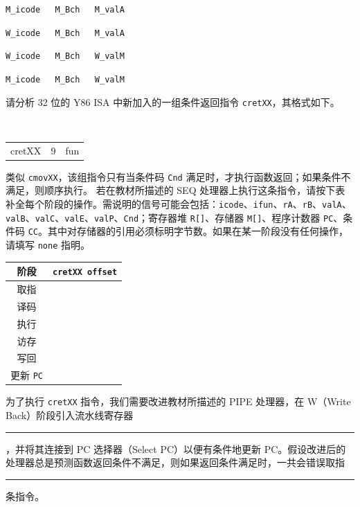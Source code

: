 \begin{problems}
        \begin{choices}
            \item \verb|M_icode   M_Bch   M_valA|
            \item \verb|W_icode   M_Bch   M_valA|
            \item \verb|W_icode   M_Bch   W_valM|
            \item \verb|M_icode   M_Bch   W_valM|
        \end{choices}
         请分析 32 位的 Y86 ISA 中新加入的一组条件返回指令 \verb|cretXX|，其格式如下。
        \begin{table}[H]
            \tt
            \centering
            \begin{tabular}{c|c|c|}
                \cline{2-3}
                cretXX & 9 & fun \\ \cline{2-3} 
            \end{tabular}
        \end{table}
        类似 \verb|cmovXX|，该组指令只有当条件码 \verb|Cnd| 满足时，才执行函数返回；如果条件不满足，则顺序执行。
        \qn 若在教材所描述的 SEQ 处理器上执行这条指令，请按下表补全每个阶段的操作。需说明的信号可能会包括：\verb|icode|、\verb|ifun|、\verb|rA|、\verb|rB|、\verb|valA|、\verb|valB|、\verb|valC|、\verb|valE|、\verb|valP|、\verb|Cnd|；寄存器堆 \verb|R[]|、存储器 \verb|M[]|、程序计数器 \verb|PC|、条件码 \verb|CC|。其中对存储器的引用必须标明字节数。如果在某一阶段没有任何操作，请填写 \texttt{none} 指明。
        \begin{table}[H]
            \centering
            \begin{tabular}{|c|c|}
                \hline
                阶段 & {\qquad \qquad \qquad \qquad} \verb|cretXX offset| {\qquad \qquad \qquad \qquad} \\ \hline
                取指 & \rule{0pt}{10ex} \\ \hline
                译码 & \rule{0pt}{10ex} \\ \hline
                执行 & \rule{0pt}{10ex} \\ \hline
                访存 & \rule{0pt}{10ex} \\ \hline
                写回 & \rule{0pt}{10ex} \\ \hline
                更新 \verb|PC| & \rule{0pt}{10ex} \\ \hline
            \end{tabular}
        \end{table}
        \qn 为了执行 \verb|cretXX| 指令，我们需要改进教材所描述的 PIPE 处理器，在 W（Write Back）阶段引入流水线寄存器 \rule{2.5cm}{0.25mm}，并将其连接到 PC 选择器（Select PC）以便有条件地更新 PC。假设改进后的处理器总是预测函数返回条件不满足，则如果返回条件满足时，一共会错误取指 \rule{2.5cm}{0.25mm} 条指令。

\end{problems}
